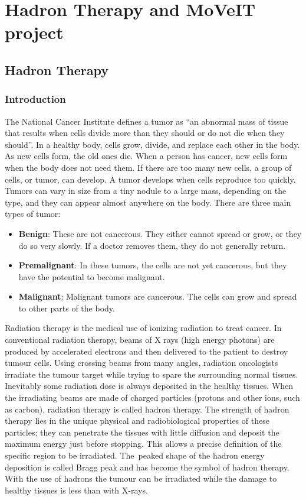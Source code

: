 \part{Hadron Therapy and MoVeIT project}
\pagestyle{fancy}
\chapter{Hadron Therapy}

\section{Introduction}
The National Cancer Institute defines a tumor\cite{tumor} as “an abnormal mass of tissue that results when cells divide more than they should or do not die when they should”.
In a healthy body, cells grow, divide, and replace each other in the body. As new cells form, the old ones die. When a person has cancer, new cells form when the body does not need them. If there are too many new cells, a group of cells, or tumor, can develop.
A tumor develops when cells reproduce too quickly. Tumors can vary in size from a tiny nodule to a large mass, depending on the type, and they can appear almost anywhere on the body.
There are three main types of tumor:
\begin{itemize}
\item \textbf{Benign}: These are not cancerous. They either cannot spread or grow, or they do so very slowly. If a doctor removes them, they do not generally return.
\item \textbf{Premalignant}: In these tumors, the cells are not yet cancerous, but they have the potential to become malignant.
\item \textbf{Malignant}: Malignant tumors are cancerous. The cells can grow and spread to other parts of the body.
\end{itemize}
Radiation therapy is the medical use of ionizing radiation to treat cancer. In conventional radiation therapy, beams of X rays (high energy photons) are produced by accelerated electrons and then delivered to the patient to destroy tumour cells. Using crossing beams from many angles, radiation oncologists irradiate the tumour target while trying to spare the surrounding normal tissues. Inevitably some radiation dose is always deposited in the healthy tissues.
When the irradiating beams are made of charged particles (protons and other ions, such as carbon), radiation therapy is called hadron therapy\cite{radiationtherapy}. The strength of hadron therapy lies in the unique physical and radiobiological properties of these particles; they can penetrate the tissues with little diffusion and deposit the maximum energy just before stopping. This allows a precise definition of the specific region to be irradiated. The~peaked shape of the hadron energy deposition is called Bragg peak and has become the symbol of hadron therapy. With the use of hadrons the tumour can be irradiated while the damage to healthy tissues is less than with X-rays.

